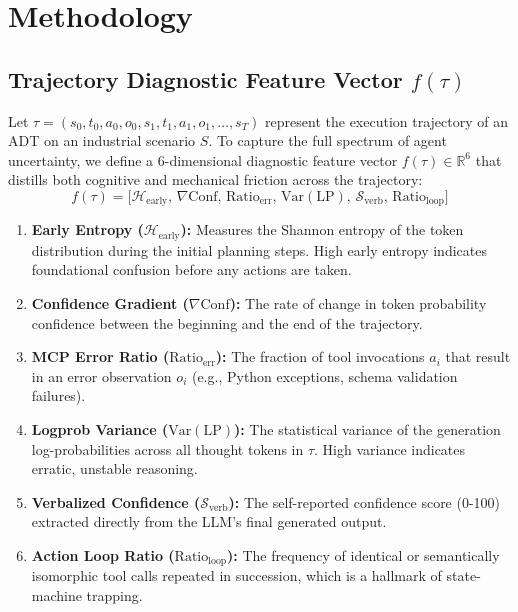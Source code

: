 \documentclass[10pt,twocolumn,a4paper]{article}
\begin{document}
\section{Methodology}

\subsection{Trajectory Diagnostic Feature Vector $f(\tau)$}
Let $\tau = (s_0, t_0, a_0, o_0, s_1, t_1, a_1, o_1, \dots, s_T)$ represent the execution trajectory of an ADT on an industrial scenario $S$. To capture the full spectrum of agent uncertainty, we define a 6-dimensional diagnostic feature vector $f(\tau) \in \mathbb{R}^6$ that distills both cognitive and mechanical friction across the trajectory:
\begin{equation}
f(\tau) = \big[ \mathcal{H}_{\text{early}}, \, \nabla\text{Conf}, \, \text{Ratio}_{\text{err}}, \, \text{Var}(\text{LP}), \, \mathcal{S}_{\text{verb}}, \, \text{Ratio}_{\text{loop}} \big]
\end{equation}

\begin{enumerate}
    \item \textbf{Early Entropy ($\mathcal{H}_{\text{early}}$):} Measures the Shannon entropy of the token distribution during the initial planning steps. High early entropy indicates foundational confusion before any actions are taken.
    \item \textbf{Confidence Gradient ($\nabla\text{Conf}$):} The rate of change in token probability confidence between the beginning and the end of the trajectory.
    \item \textbf{MCP Error Ratio ($\text{Ratio}_{\text{err}}$):} The fraction of tool invocations $a_i$ that result in an error observation $o_i$ (e.g., Python exceptions, schema validation failures).
    \item \textbf{Logprob Variance ($\text{Var}(\text{LP})$):} The statistical variance of the generation log-probabilities across all thought tokens in $\tau$. High variance indicates erratic, unstable reasoning.
    \item \textbf{Verbalized Confidence ($\mathcal{S}_{\text{verb}}$):} The self-reported confidence score (0-100) extracted directly from the LLM's final generated output.
    \item \textbf{Action Loop Ratio ($\text{Ratio}_{\text{loop}}$):} The frequency of identical or semantically isomorphic tool calls repeated in succession, which is a hallmark of state-machine trapping.
\end{enumerate}
\end{document}
